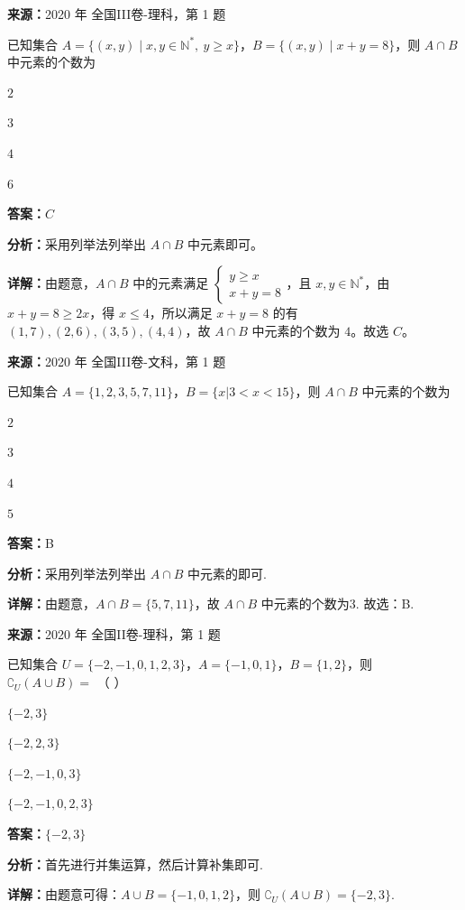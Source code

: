 \begin{question}[points=5]
\textbf{来源：}2020 年 全国III卷-理科，第 1 题\par
已知集合 $A=\{(x,y)\mid x,y\in\mathbb{N}^*,\ y\ge x\}$，$B=\{(x,y)\mid x+y=8\}$，则 $A\cap B$ 中元素的个数为
\begin{choices}
  \item $2$
  \item $3$
  \item $4$
  \item $6$
\end{choices}
\begin{solution}
\textbf{答案：}$C$

\textbf{分析：}采用列举法列举出 $A\cap B$ 中元素即可。

\textbf{详解：}由题意，$A\cap B$ 中的元素满足 $\begin{cases} y\ge x \\ x+y=8 \end{cases}$，且 $x,y\in\mathbb{N}^*$，由 $x+y=8\ge 2x$，得 $x\le 4$，所以满足 $x+y=8$ 的有 $(1,7),(2,6),(3,5),(4,4)$，故 $A\cap B$ 中元素的个数为 $4$。故选 $C$。
\end{solution}
\end{question}

\begin{question}[points=5]
\textbf{来源：}2020 年 全国III卷-文科，第 1 题\par
已知集合 $A=\{1,2,3,5,7,11\}$，$B=\{x|3<x<15\}$，则 $A\cap B$ 中元素的个数为
\begin{choices}
  \item $2$
  \item $3$
  \item $4$
  \item $5$
\end{choices}
\begin{solution}
\textbf{答案：}B

\textbf{分析：}采用列举法列举出 $A\cap B$ 中元素的即可.

\textbf{详解：}由题意，$A\cap B=\{5,7,11\}$，故 $A\cap B$ 中元素的个数为3. 故选：B.
\end{solution}
\end{question}

\begin{question}[points=5]
\textbf{来源：}2020 年 全国II卷-理科，第 1 题\par
已知集合 $U=\{-2,-1,0,1,2,3\}$，$A=\{-1,0,1\}$，$B=\{1,2\}$，则 $\complement_U(A\cup B)=$ （ ）
\begin{choices}
  \item $\{-2,3\}$
  \item $\{-2,2,3\}$
  \item $\{-2,-1,0,3\}$
  \item $\{-2,-1,0,2,3\}$
\end{choices}
\begin{solution}
\textbf{答案：}$\{-2,3\}$

\textbf{分析：}首先进行并集运算，然后计算补集即可.

\textbf{详解：}由题意可得：$A\cup B=\{-1,0,1,2\}$，则 $\complement_U(A\cup B)=\{-2,3\}$.
\end{solution}
\end{question}

